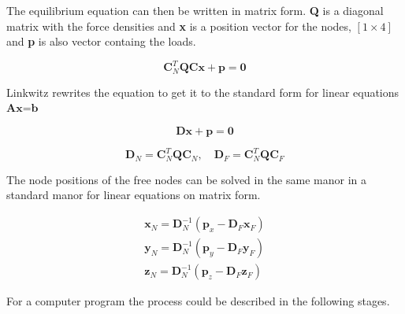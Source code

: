The equilibrium equation can then be written in matrix form. \textbf{Q} is a diagonal matrix with the force densities and \textbf{x} is a position vector for the nodes, $[1\times 4]$ and \textbf{p} is also vector containg the loads. 

\begin{equation}
 \textbf{C}^T_N\textbf{Q}\textbf{C}\textbf{x} + \textbf{p} = \textbf{0}
\end{equation}

Linkwitz rewrites the equation to get it to the standard form for linear equations $\textbf{Ax=b}$

\begin{equation}
 \textbf{Dx} + \textbf{p} = \textbf{0}
\end{equation}

\begin{equation}
\textbf{D}_N = \textbf{C}^T_N\textbf{Q}\textbf{C}_N,\quad \textbf{D}_F = \textbf{C}^T_N\textbf{Q}\textbf{C}_F 
\end{equation}

The node positions of the free nodes can be solved in the same manor in a standard manor for linear equations on matrix form.

\begin{align*} 
   \textbf{x}_N = \textbf{D}_N^{-1}(\textbf{p}_x - \textbf{D}_F\textbf{x}_F) \\ 
   \textbf{y}_N = \textbf{D}_N^{-1}(\textbf{p}_y - \textbf{D}_F\textbf{y}_F) \\ 
   \textbf{z}_N = \textbf{D}_N^{-1}(\textbf{p}_z - \textbf{D}_F\textbf{z}_F) 
\end{align*}

For a computer program the process could be described in the following stages.

